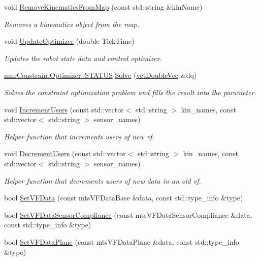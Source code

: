 \begin{DoxyCompactItemize}
void \hyperlink{classmts_v_f_controller_a742a86f34faf0b1416939bf21ddf366b}{Remove\-Kinematics\-From\-Map} (const std\-::string \&kin\-Name)
\begin{DoxyCompactList}\small\item\em Removes a kinematics object from the map. \end{DoxyCompactList}\item 
void \hyperlink{classmts_v_f_controller_a9ea569dcf499c4a086ef9e9751c9e55e}{Update\-Optimizer} (double Tick\-Time)
\begin{DoxyCompactList}\small\item\em Updates the robot state data and control optimizer. \end{DoxyCompactList}\item 
\hyperlink{classnmr_constraint_optimizer_ad46bf972892431d2c0a43a7099aec898}{nmr\-Constraint\-Optimizer\-::\-S\-T\-A\-T\-U\-S} \hyperlink{classmts_v_f_controller_a8f672fd70223794ef98ecf237589cc44}{Solve} (\hyperlink{vct_dynamic_vector_types_8h_ade4b3068c86fb88f41af2e5187e491c2}{vct\-Double\-Vec} \&dq)
\begin{DoxyCompactList}\small\item\em Solves the constraint optimization problem and fills the result into the parameter. \end{DoxyCompactList}\item 
void \hyperlink{classmts_v_f_controller_a0a0eb21d7cad2a07000411e0bb82d34a}{Increment\-Users} (const std\-::vector$<$ std\-::string $>$ kin\-\_\-names, const std\-::vector$<$ std\-::string $>$ sensor\-\_\-names)
\begin{DoxyCompactList}\small\item\em Helper function that increments users of new vf. \end{DoxyCompactList}\item 
void \hyperlink{classmts_v_f_controller_aecb932995a8b1fb3cdfa57ba38947d85}{Decrement\-Users} (const std\-::vector$<$ std\-::string $>$ kin\-\_\-names, const std\-::vector$<$ std\-::string $>$ sensor\-\_\-names)
\begin{DoxyCompactList}\small\item\em Helper function that decrements users of new data in an old vf. \end{DoxyCompactList}\item 
bool \hyperlink{classmts_v_f_controller_a9440eb1cf7cf204da43730bfcbe00ca8}{Set\-V\-F\-Data} (const mts\-V\-F\-Data\-Base \&data, const std\-::type\-\_\-info \&type)
\item 
bool \hyperlink{classmts_v_f_controller_a81a83b84ce61fab4563e344579e6a37a}{Set\-V\-F\-Data\-Sensor\-Compliance} (const mts\-V\-F\-Data\-Sensor\-Compliance \&data, const std\-::type\-\_\-info \&type)
\item 
bool \hyperlink{classmts_v_f_controller_accdcc21711fac674914793949bd02bb1}{Set\-V\-F\-Data\-Plane} (const mts\-V\-F\-Data\-Plane \&data, const std\-::type\-\_\-info \&type)
\end{DoxyCompactItemize}
